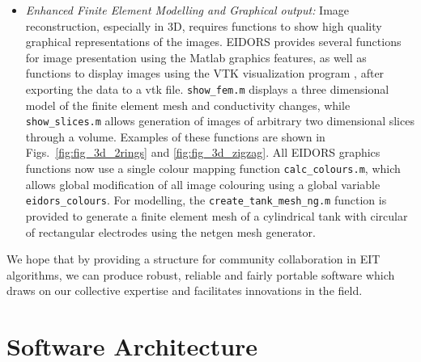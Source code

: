 \documentclass[12pt]{iopart}
\begin{document}
\begin{itemize}
  \item {\em Enhanced Finite Element Modelling and Graphical output:}
Image reconstruction, especially in 3D, requires functions
to show high quality graphical representations of the images.
EIDORS provides several functions for image presentation using
the Matlab graphics features, as well as functions to 
display images using the VTK visualization program 
\cite{Ramachandran_2003}, after exporting the data to a vtk file.
{\tt show\_fem.m} displays a three dimensional model of the
finite element mesh and conductivity changes, while
{\tt show\_slices.m} allows generation of images of arbitrary
two dimensional slices through a volume. Examples of these
functions are shown in Figs.~\ref{fig:fig_3d_2rings} and
 \ref{fig:fig_3d_zigzag}.
All EIDORS graphics functions now use a single colour
mapping function {\tt calc\_colours.m}, which allows
global modification of all image colouring using a
global variable {\tt eidors\_colours}.
For modelling, the {\tt create\_tank\_mesh\_ng.m}
function is provided to generate
a finite element mesh of a cylindrical tank with circular of rectangular
electrodes using the netgen \cite{Schoberl_1997} mesh generator.


%

\end{itemize}
We hope that by providing a structure for community collaboration
in EIT algorithms, we can produce robust,
reliable and fairly portable software which draws on our collective
expertise and facilitates innovations in the field.

\section{Software Architecture}
\end{document}
